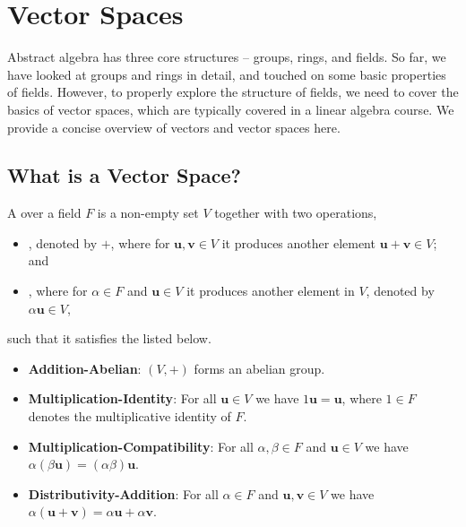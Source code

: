 \chapter{Vector Spaces}
Abstract algebra has three core structures -- groups, rings, and fields. So far, we have looked at groups and rings in detail, and touched on some basic properties of fields. However, to properly explore the structure of fields, we need to cover the basics of vector spaces, which are typically covered in a linear algebra course. We provide a concise overview of vectors and vector spaces here.

\section{What is a Vector Space?}
\begin{definition}
    A  over a field $F$ is a non-empty set $V$ together with two operations,
    \begin{itemize}
        \item {}, denoted by $+$, where for $\textbf{u}, \textbf{v} \in V$ it produces another element $\textbf{u} + \textbf{v} \in V$; and
        \item {}, where for $\alpha \in F$ and $\textbf{u} \in V$ it produces another element in $V$, denoted by $\alpha\textbf{u} \in V$,
    \end{itemize}
    such that it satisfies the  listed below.
    \begin{itemize}
        \item \textbf{Addition-Abelian}: $(V, +)$ forms an abelian group.

        \item \textbf{Multiplication-Identity}: For all $\textbf{u} \in V$ we have $1\textbf{u} = \textbf{u}$, where $1 \in F$ denotes the multiplicative identity of $F$.

        \item \textbf{Multiplication-Compatibility}: For all $\alpha,\beta \in F$ and $\textbf{u} \in V$ we have $\alpha(\beta\textbf{u}) = (\alpha\beta)\textbf{u}$.

        \item \textbf{Distributivity-Addition}: For all $\alpha \in F$ and $\textbf{u}, \textbf{v} \in V$ we have $\alpha(\textbf{u} + \textbf{v}) = \alpha\textbf{u} + \alpha\textbf{v}$.


\end{itemize}
\end{definition}
